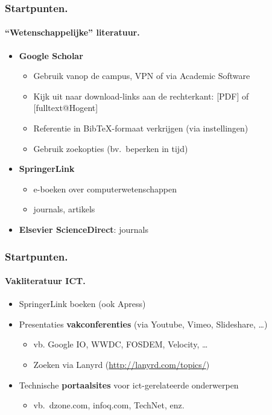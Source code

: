 \documentclass[aspectratio=169]{beamer}
\begin{document}
\begin{frame}
  \frametitle{Startpunten.}
  \framesubtitle{``Wetenschappelijke'' literatuur.}

  \begin{itemize}
    \item<+-> \textbf{Google Scholar}
      \begin{itemize}
        \item Gebruik vanop de campus, VPN of via Academic Software
        \item Kijk uit naar download-links aan de rechterkant: [PDF] of [fulltext@Hogent]
        \item Referentie in Bib{\TeX}-formaat verkrijgen (via instellingen)
        \item Gebruik zoekopties (bv.~beperken in tijd)
      \end{itemize}
    \item<+-> \textbf{SpringerLink}
      \begin{itemize}
        \item e-boeken over computerwetenschappen
        \item journals, artikels
      \end{itemize}
    \item<+-> \textbf{Elsevier ScienceDirect}: journals
  \end{itemize}
\end{frame}

\begin{frame}
  \frametitle{Startpunten.}
  \framesubtitle{Vakliteratuur ICT.}

  \begin{itemize}
    \item SpringerLink boeken (ook Apress)
    \item Presentaties \textbf{vakconferenties} (via Youtube, Vimeo, Slideshare, \dots)
    \begin{itemize}
      \item vb. Google IO, WWDC, FOSDEM, Velocity, \dots
      \item Zoeken via Lanyrd (\url{http://lanyrd.com/topics/})
    \end{itemize}
    \item<+-> Technische \textbf{portaalsites} voor ict-gerelateerde onderwerpen
    \begin{itemize}
      \item vb.~dzone.com, infoq.com, TechNet, enz.
    \end{itemize}
  \end{itemize}
\end{frame}
\end{document}
